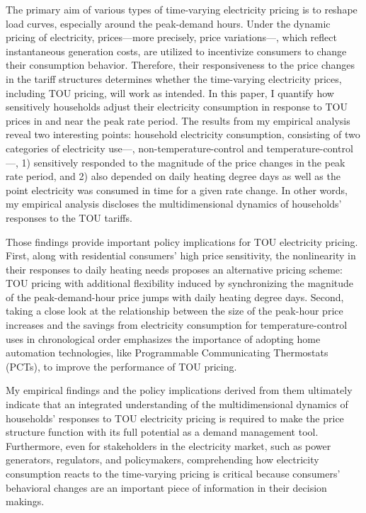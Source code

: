 The primary aim of various types of time-varying electricity pricing is to reshape load curves, especially around the peak-demand hours. Under the dynamic pricing of electricity, prices---more precisely, price variations---, which reflect instantaneous generation costs, are utilized to incentivize consumers to change their consumption behavior. Therefore, their responsiveness to the price changes in the tariff structures determines whether the time-varying electricity prices, including TOU pricing, will work as intended. In this paper, I quantify how sensitively households adjust their electricity consumption in response to TOU prices in and near the peak rate period. The results from my empirical analysis reveal two interesting points: household electricity consumption, consisting of two categories of electricity use---, non-temperature-control and temperature-control---, 1) sensitively responded to the magnitude of the price changes in the peak rate period, and 2) also depended on daily heating degree days as well as the point electricity was consumed in time for a given rate change. In other words, my empirical analysis discloses the multidimensional dynamics of households' responses to the TOU tariffs. 

Those findings provide important policy implications for TOU electricity pricing. First, along with residential consumers' high price sensitivity, the nonlinearity in their responses to daily heating needs proposes an alternative pricing scheme: TOU pricing with additional flexibility induced by synchronizing the magnitude of the peak-demand-hour price jumps with daily heating degree days. Second, taking a close look at the relationship between the size of the peak-hour price increases and the savings from electricity consumption for temperature-control uses in chronological order emphasizes the importance of adopting home automation technologies, like Programmable Communicating Thermostats (PCTs), to improve the performance of TOU pricing. 

My empirical findings and the policy implications derived from them ultimately indicate that an integrated understanding of the multidimensional dynamics of households' responses to TOU electricity pricing is required to make the price structure function with its full potential as a demand management tool. Furthermore, even for stakeholders in the electricity market, such as power generators, regulators, and policymakers, comprehending how electricity consumption reacts to the time-varying pricing is critical because consumers' behavioral changes are an important piece of information in their decision makings. 
